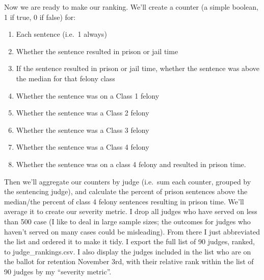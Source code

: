 \documentclass[
]{article}
\newenvironment{Shaded}{\begin{snugshade}}{\end{snugshade}}
\newcommand{\DecValTok}[1]{\textcolor[rgb]{0.00,0.00,0.81}{#1}}
\newcommand{\NormalTok}[1]{#1}
\newcommand{\OperatorTok}[1]{\textcolor[rgb]{0.81,0.36,0.00}{\textbf{#1}}}
\newcommand{\StringTok}[1]{\textcolor[rgb]{0.31,0.60,0.02}{#1}}
\providecommand{\tightlist}{%
  \setlength{\itemsep}{0pt}\setlength{\parskip}{0pt}}
\begin{document}
\begin{Shaded}
\end{Shaded}

Now we are ready to make our ranking. We'll create a counter (a simple
boolean, 1 if true, 0 if false) for:

\begin{enumerate}
\def\labelenumi{\arabic{enumi}.}
\tightlist
\item
  Each sentence (i.e.~1 always)
\item
  Whether the sentence resulted in prison or jail time
\item
  If the sentence resulted in prison or jail time, whether the sentence
  was above the median for that felony class
\item
  Whether the sentence was on a Class 1 felony
\item
  Whether the sentence was a Class 2 felony
\item
  Whether the sentence was a Class 3 felony
\item
  Whether the sentence was a Class 4 felony\\
\item
  Whether the sentence was on a class 4 felony and resulted in prison
  time.
\end{enumerate}

Then we'll aggregate our counters by judge (i.e.~sum each counter,
grouped by the sentencing judge), and calculate the percent of prison
sentences above the median/the percent of class 4 felony sentences
resulting in prison time. We'll average it to create our severity
metric. I drop all judges who have served on less than 500 case (I like
to deal in large sample sizes; the outcomes for judges who haven't
served on many cases could be misleading). From there I just abbreviated
the list and ordered it to make it tidy. I export the full list of 90
judges, ranked, to judge\_rankings.csv. I also display the judges
included in the list who are on the ballot for retention November 3rd,
with their relative rank within the list of 90 judges by my ``severity
metric''.
\end{document}
